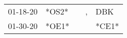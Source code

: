 \begin{supertabular}{p{0.07\textwidth}p{0.06\textwidth}p{0.02\textwidth}p{0.02\textwidth}p{0.06\textwidth}}
 01-18-20\textsuperscript{} &  *OS2* &   &  , &  DBK\textsuperscript{} \\
 01-30-20\textsuperscript{} &  *OE1* &   &    &                  *CE1* \\
\end{supertabular}
